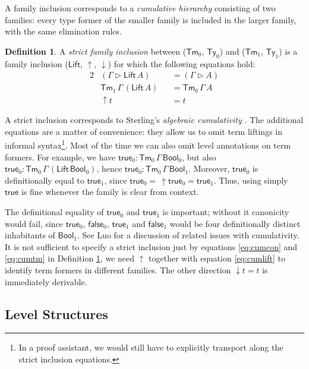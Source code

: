 \documentclass[a4paper,UKenglish,cleveref, autoref, thm-restate]{lipics-v2021}
\theoremstyle{remark}
\theoremstyle{definition}
\newtheorem{mydefinition}{Definition}
\newcommand{\Ty}{\mathsf{Ty}}
\newcommand{\Tm}{\mathsf{Tm}}
\newcommand{\ext}{\triangleright}
\newcommand{\Bool}{\mathsf{Bool}}
\newcommand{\true}{\mathsf{true}}
\newcommand{\false}{\mathsf{false}}
\newcommand{\up}{\uparrow}
\newcommand{\down}{\downarrow}
\newcommand{\Lift}{\mathsf{Lift}}
\begin{document}
A family inclusion corresponds to a \emph{cumulative hierarchy} consisting of
two families: every type former of the smaller family is included in the larger
family, with the same elimination rules.

\begin{mydefinition}\label{def:strict_inclusion}
A \emph{strict family inclusion} between ($\Tm_0$, $\Ty_0$) and ($\Tm_1$,
$\Ty_1$) is a family inclusion ($\Lift$, $\up$, $\down$) for which the following equations hold:
\begin{alignat}{2}
  & (\Gamma \ext \Lift\,A) &&= (\Gamma \ext A)     \label{eq:cumcon}    \\
  & \Tm_1\,\Gamma\,(\Lift\,A) &&= \Tm_0\,\Gamma\,A  \label{eq:cumtm}     \\
  & \up\!t &&= t                                    \label{eq:cumlift}
\end{alignat}
\end{mydefinition}

A strict inclusion corresponds to Sterling's \emph{algebraic cumulativity}
\cite{sterling2019algebraic}. The additional equations are a matter of convenience: they allow us
to omit term liftings in informal syntax\footnote{In a proof assistant, we would
  still have to explicitly transport along the strict inclusion
  equations.}. Most of the time we can also omit level annotations
on term formers. For example, we have $\true_0 : \Tm_0\,\Gamma\,\Bool_0$,
but also $\true_0 : \Tm_0\,\Gamma\,(\Lift\,\Bool_0)$, hence $\true_0 :
\Tm_0\,\Gamma\,\Bool_1$. Moreover, $\true_0$ is definitionally equal to
$\true_1$, since $\true_0 =\,\up\!\true_0 = \true_1$. Thus, using simply $\true$
is fine whenever the family is clear from context.

The definitional equality of $\true_0$ and $\true_1$ is important; without it
canonicity would fail, since $\true_0$, $\false_0$, $\true_1$ and $\false_1$
would be four definitionally distinct inhabitants of $\Bool_1$. See Luo
\cite{luo2012notes} for a discussion of related issues with cumulativity. It is
not sufficient to specify a strict inclusion just by equations \ref{eq:cumcon}
and \ref{eq:cumtm} in Definition \ref{def:strict_inclusion}, we need $\up$
together with equation \ref{eq:cumlift} to identify term formers in different
families. The other direction $\down\!t = t$ is immediately derivable.

\subsection{Level Structures}
\label{sec:level_structures}
\end{document}
